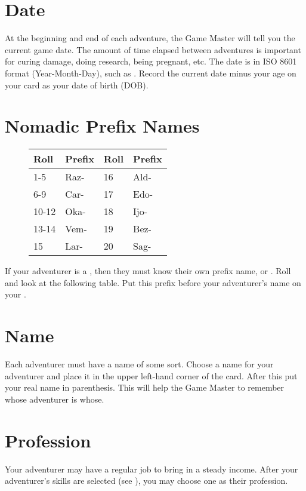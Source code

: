 \begin{multicols*}{2}
\section{Date}
At the beginning and end of each adventure, the Game Master will tell you the current game date. The amount of time elapsed between adventures is important for curing damage, doing research, being pregnant, etc. The date is in ISO 8601 format (Year-Month-Day), such as . Record the current date minus your age on your card as your date of birth (DOB).
\section{Nomadic Prefix Names}
\begin{wrapfigure}[9]{l}[0pt]{5cm}
\begin{normbox}
\small
\begin{tabular}{l l|l l}
Roll & Prefix & Roll & Prefix\\
\midrule
1-5 & Raz- & 16 & Ald-\\
6-9 & Car- & 17 & Edo-\\
10-12 & Oka- & 18 & Ijo-\\
13-14 & Vem- & 19 & Bez-\\
15 & Lar- & 20 & Sag-\\
\end{tabular}
\normalsize
\end{normbox}
\end{wrapfigure}
If your adventurer is a , then they must know their own prefix name, or . Roll  and look at the following table. Put this prefix before your adventurer's name on your .

\section{Name}
Each adventurer must have a name of some sort. Choose a name for your adventurer and place it in the upper left-hand corner of the card. After this put your real name in parenthesis. This will help the Game Master to remember whose adventurer is whose.
\section{Profession}
Your adventurer may have a regular job to bring in a steady income. After your adventurer's skills are selected (see ), you may choose one as their profession.
\pagebreak

\end{multicols*}
